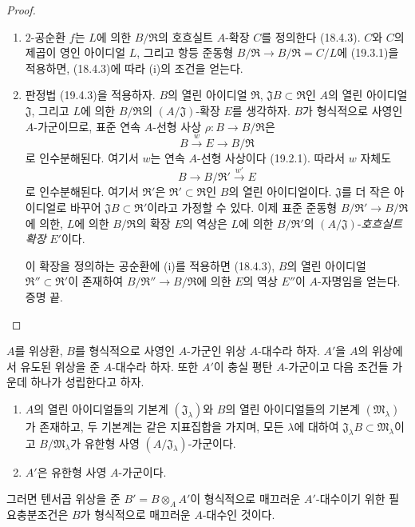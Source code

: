 \begin{proof}
\begin{enumerate}
  \item[(i)] $2$-공순환 $f$는 $L$에 의한 $B/\mathfrak R$의
  호흐실트 $A$-확장 $C$를 정의한다 (18.4.3). $C$와 $C$의 제곱이
  영인 아이디얼 $L$, 그리고 항등 준동형
  $B/\mathfrak R\to B/\mathfrak R=C/L$에 (19.3.1)을 적용하면,
  (18.4.3)에 따라 (i)의 조건을 얻는다.

  \item[(ii)] 판정법 (19.4.3)을 적용하자. $B$의 열린 아이디얼
  $\mathfrak R$, $\mathfrak JB\subset\mathfrak R$인 $A$의 열린
  아이디얼 $\mathfrak J$, 그리고 $L$에 의한
  $B/\mathfrak R$의 $(A/\mathfrak J)$-확장 $E$를 생각하자.
  $B$가 형식적으로 사영인 $A$-가군이므로, 표준 연속 $A$-선형
  사상 $\rho:B\to B/\mathfrak R$은
  \[
    B\xrightarrow{w}E\longrightarrow B/\mathfrak R
  \]
  로 인수분해된다. 여기서 $w$는 연속 $A$-선형 사상이다 (19.2.1).
  따라서 $w$ 자체도
  \[
    B\longrightarrow B/\mathfrak R'\xrightarrow{w'}E
  \]
  로 인수분해된다. 여기서 $\mathfrak R'$은
  $\mathfrak R'\subset\mathfrak R$인 $B$의 열린 아이디얼이다.
  $\mathfrak J$를 더 작은 아이디얼로 바꾸어
  $\mathfrak JB\subset\mathfrak R'$이라고 가정할 수 있다. 이제
  표준 준동형 $B/\mathfrak R'\to B/\mathfrak R$에 의한,
  $L$에 의한 $B/\mathfrak R$의 확장 $E$의 역상은 $L$에 의한
  $B/\mathfrak R'$의 $(A/\mathfrak J)$-\emph{호흐실트 확장}
  $E'$이다.


  이 확장을 정의하는 공순환에 (i)를 적용하면 (18.4.3), $B$의
  열린 아이디얼 $\mathfrak R''\subset\mathfrak R'$이 존재하여
  $B/\mathfrak R''\to B/\mathfrak R$에 의한 $E$의 역상
  $E''$이 $A$-자명임을 얻는다. 증명 끝.
\end{enumerate}
\end{proof}

\begin{corollary}[19.4.6]
\label{0.19.4.6-fr}
$A$를 위상환, $B$를 형식적으로 사영인 $A$-가군인 위상
$A$-대수라 하자. $A'$을 $A$의 위상에서 유도된 위상을 준
$A$-대수라 하자. 또한 $A'$이 충실 평탄 $A$-가군이고 다음 조건들
가운데 하나가 성립한다고 하자.
\begin{enumerate}
  \item[$1^\circ$] $A$의 열린 아이디얼들의 기본계
  $(\mathfrak J_\lambda)$와 $B$의 열린 아이디얼들의 기본계
  $(\mathfrak M_\lambda)$가 존재하고, 두 기본계는 같은 지표집합을
  가지며, 모든
  $\lambda$에 대하여
  $\mathfrak J_\lambda B\subset\mathfrak M_\lambda$이고
  $B/\mathfrak M_\lambda$가 유한형 사영
  $(A/\mathfrak J_\lambda)$-가군이다.
  \item[$2^\circ$] $A'$은 유한형 사영 $A$-가군이다.
\end{enumerate}
그러면 텐서곱 위상을 준
$B'=B\otimes_A A'$이 형식적으로 매끄러운 $A'$-대수이기 위한
필요충분조건은 $B$가 형식적으로 매끄러운 $A$-대수인 것이다.
\end{corollary}

